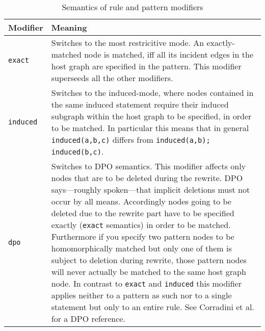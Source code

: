 \begin{table}[htbp]
    \begin{tabularx}{\linewidth}{l|X}
        \bf Modifier & \bf Meaning \\\hline
        \texttt{exact} & Switches to the most restricitive mode. An exactly-matched node is matched, iff all its incident edges in the host graph are specified in the pattern. This modifier superseeds all the other modifiers.\\
        \texttt{induced} & Switches to the induced-mode, where nodes contained in the same induced statement require their induced subgraph within the host graph to be specified, in order to be matched. In particular this means that in general \texttt{induced(a,b,c)} differs from \texttt{induced(a,b); induced(b,c)}.\\
        \texttt{dpo} & Switches to DPO semantics. This modifier affects only nodes that are to be deleted during the rewrite. DPO says---roughly spoken---that implicit deletions must not occur by all means. Accordingly nodes going to be deleted due to the rewrite part have to be specified exactly (\texttt{exact} semantics) in order to be matched. Furthermore if you specify two pattern nodes to be homomorphically matched but only one of them is subject to deletion during rewrite, those pattern nodes will never actually be matched to the same host graph node. In contrast to \texttt{exact} and \texttt{induced} this modifier applies neither to a pattern as such nor to a single statement but only to an entire rule. See Corradini et al.\cite{dpoapproach} for a DPO reference.\\
    \end{tabularx}    
    \caption{Semantics of rule and pattern modifiers}
    \label{tbl:rules:modifiers}
\end{table}

